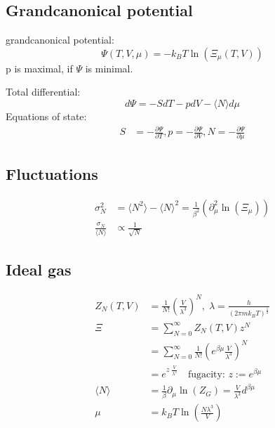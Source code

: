 \subsection*{Grandcanonical potential}
grandcanonical potential:
\begin{equation*}
    \Psi(T,V,\mu) = -k_B T \ln \left( \Xi_\mu (T,V)\right)
\end{equation*}
p is maximal, if $\Psi$ is minimal. 

Total differential:
\begin{equation*}
        d\Psi = -SdT -pdV - \langle N \rangle d\mu
\end{equation*}
Equations of state:
\begin{equation*}
    \begin{aligned}
        S &= - \frac{\partial \Psi}{\partial T} , p = - \frac{\partial \Psi}{\partial V}, N = - \frac{\partial \Psi}{\partial \mu}
    \end{aligned}
\end{equation*}

\subsection*{Fluctuations}
\begin{equation*}
    \begin{aligned}
        \sigma_N^2 &= \langle N^2 \rangle - \langle N \rangle^2 = \frac{1}{\beta^2} \left( \partial_\mu^2 \ln(\Xi_\mu) \right) \\
        \frac{\sigma_N}{\langle N \rangle} & \propto \frac{1}{\sqrt{N}}
    \end{aligned}
\end{equation*}

\subsection*{Ideal gas}

\begin{equation*}
    \begin{aligned}
        Z_N(T,V) &= \frac{1}{N!} \left(\frac{V}{\lambda^3}\right)^N , \; \lambda = \frac{h}{(2 \pi m k_B T)^\frac{1}{2}} \\
        \Xi &= \sum_{N=0}^\infty Z_N(T,V)z^N \\
            &= \sum_{N=0}^\infty \frac{1}{N!}\left(e^{\beta \mu} \frac{V}{\lambda^3}\right)^N \\
            &= e^{z \; \frac{V}{\lambda^3}} \quad \text{fugacity: } z:= e^{\beta \mu} \\
        \langle N \rangle &= \frac{1}{\beta} \partial_\mu \ln (Z_G) = \frac{V}{\lambda^3} d^{\beta \mu} \\
        \mu &= k_B T \ln \left(\frac{N \lambda^3}{V}\right)
    \end{aligned}
\end{equation*}

